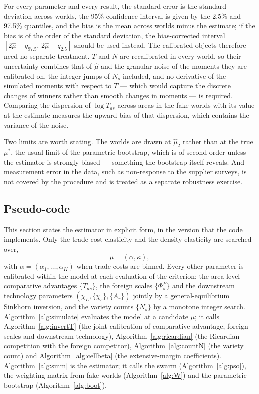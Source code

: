 For every parameter and every result, the standard error is the standard deviation across worlds, the 95\% confidence interval is given by the 2.5\% and 97.5\% quantiles, and the bias is the mean across worlds minus the estimate; if the bias is of the order of the standard deviation, the bias-corrected interval $[2\hat\mu-q_{97.5},\,2\hat\mu-q_{2.5}]$ should be used instead. The calibrated objects therefore need no separate treatment. $T$ and $N$ are recalibrated in every world, so their uncertainty combines that of $\hat\mu$ and the granular noise of the moments they are calibrated on, the integer jumps of $N_s$ included, and no derivative of the simulated moments with respect to $T$ --- which would capture the discrete changes of winners rather than smooth changes in moments --- is required. Comparing the dispersion of $\log T_{as}$ across areas in the fake worlds with its value at the estimate measures the upward bias of that dispersion, which contains the variance of the noise.

Two limits are worth stating. The worlds are drawn at $\hat\mu_2$ rather than at the true $\mu^*$, the usual limit of the parametric bootstrap, which is of second order unless the estimator is strongly biased --- something the bootstrap itself reveals. And measurement error in the data, such as non-response to the supplier surveys, is not covered by the procedure and is treated as a separate robustness exercise.



\subsection{Pseudo-code}
\label{app:pseudocode}

\providecommand{\var}[1]{\mathit{#1}}
\makeatletter
\providecommand{\LineComment}[1]{\Statex \hskip\ALG@thistlm \(\triangleright\) \textit{#1}}
\makeatother

This section states the estimator in explicit form, in the version that the code implements. Only the trade-cost elasticity and the density elasticity are searched over,
$$
\mu=(\alpha,\kappa),
$$
with $\alpha=(\alpha_1,\dots,\alpha_K)$ when trade costs are binned. Every other parameter is calibrated within the model at each evaluation of the criterion: the area-level comparative advantages $\{T_{as}\}$, the foreign scales $\{\Phi^F_s\}$ and the downstream technology parameters $(\chi_L,\{\chi_s\},\{A_r\})$ jointly by a general-equilibrium Sinkhorn inversion, and the variety counts $\{N_s\}$ by a monotone integer search. Algorithm~\ref{alg:simulate} evaluates the model at a candidate $\mu$; it calls Algorithm~\ref{alg:invertT} (the joint calibration of comparative advantage, foreign scales and downstream technology), Algorithm~\ref{alg:ricardian} (the Ricardian competition with the foreign competitor), Algorithm~\ref{alg:countN} (the variety count) and Algorithm~\ref{alg:cellbeta} (the extensive-margin coefficients). Algorithm~\ref{alg:smm} is the estimator; it calls the swarm (Algorithm~\ref{alg:pso}), the weighting matrix from fake worlds (Algorithm~\ref{alg:W}) and the parametric bootstrap (Algorithm~\ref{alg:boot}).

